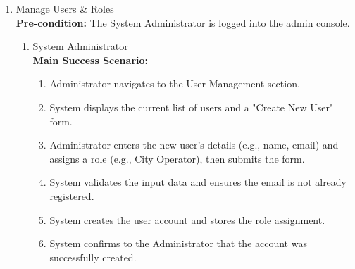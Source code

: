 {\begin{enumerate}[{\bf BE1.}]
	\item Manage Users \& Roles \\
    {\bf Pre-condition:} The System Administrator is logged into the admin console.
    \begin{enumerate}[{\bf VP1.}]
        \item System Administrator \\
            {\bf Main Success Scenario:}
                \begin{enumerate}[1. ]
                    \item Administrator navigates to the User Management section.
                    \item System displays the current list of users and a "Create New User" form.
                    \item Administrator enters the new user's details (e.g., name, email) and assigns a role (e.g., City Operator), then submits the form.
                    \item System validates the input data and ensures the email is not already registered.
                    \item System creates the user account and stores the role assignment.
                    \item System confirms to the Administrator that the account was successfully created.
                \end{enumerate}


\end{enumerate}
\end{enumerate}}
